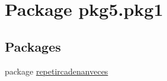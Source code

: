 \hypertarget{namespacepkg5_1_1pkg1}{}\section{Package pkg5.\+pkg1}
\label{namespacepkg5_1_1pkg1}
\subsection*{Packages}
\begin{DoxyCompactItemize}
\item 
package \mbox{\hyperlink{namespacepkg5_1_1pkg1_1_1repetircadenanveces}{repetircadenanveces}}
\end{DoxyCompactItemize}
